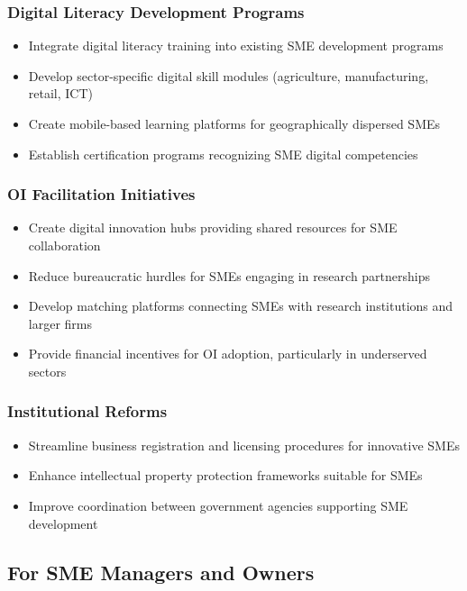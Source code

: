\subsubsection{Digital Literacy Development Programs}
\begin{itemize}
    \item Integrate digital literacy training into existing SME development programs
    \item Develop sector-specific digital skill modules (agriculture, manufacturing, retail, ICT)
    \item Create mobile-based learning platforms for geographically dispersed SMEs
    \item Establish certification programs recognizing SME digital competencies
\end{itemize}

\subsubsection{OI Facilitation Initiatives}
\begin{itemize}
    \item Create digital innovation hubs providing shared resources for SME collaboration
    \item Reduce bureaucratic hurdles for SMEs engaging in research partnerships
    \item Develop matching platforms connecting SMEs with research institutions and larger firms
    \item Provide financial incentives for OI adoption, particularly in underserved sectors
\end{itemize}

\subsubsection{Institutional Reforms}
\begin{itemize}
    \item Streamline business registration and licensing procedures for innovative SMEs
    \item Enhance intellectual property protection frameworks suitable for SMEs
    \item Improve coordination between government agencies supporting SME development
\end{itemize}

\subsection{For SME Managers and Owners}

